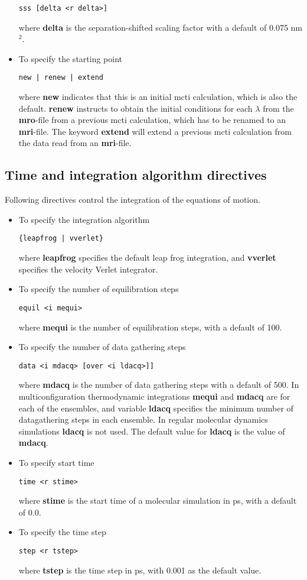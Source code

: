 \begin{itemize}
\begin{verbatim}
sss [delta <r delta>]
\end{verbatim}
where {\bf delta} is the separation-shifted scaling factor with a default
of 0.075 nm$^2$.
\item
To specify the starting point
\begin{verbatim}
new | renew | extend
\end{verbatim}
where {\bf new} indicates that this is an initial mcti calculation, which
is also the default. {\bf renew} instructs to obtain the initial
conditions for each $\lambda$ from the {\bf mro}-file from a previous 
mcti calculation, which has to be renamed to an {\bf mri}-file. The
keyword {\bf extend} will extend a previous mcti calculation from the
data read from an {\bf mri}-file.
\end{itemize}
\subsection{Time and integration algorithm directives}
Following directives control the integration of the equations of motion.
\begin{itemize}
\item
To specify the integration algorithm
\begin{verbatim}
{leapfrog | vverlet}
\end{verbatim}
where {\bf leapfrog} specifies the default leap frog integration, and
{\bf vverlet} specifies the velocity Verlet integrator.
\item
To specify the number of equilibration steps
\begin{verbatim}
equil <i mequi>
\end{verbatim}
where {\bf mequi} is the number of equilibration steps, with a default
of 100.
\item
To specify the number of data gathering steps
\begin{verbatim}
data <i mdacq> [over <i ldacq>]]
\end{verbatim}
where {\bf mdacq} is the number of data gathering steps with a
default of 500. In multiconfiguration thermodynamic integrations
{\bf mequi} and {\bf mdacq} are for each of the ensembles, and
variable {\bf ldacq} specifies the minimum number of datagathering steps 
in each ensemble. In regular molecular dynamics simulations {\bf ldacq}
is not used. The default value for {\bf ldacq} is the value of {\bf mdacq}.
\item
To specify start time
\begin{verbatim}
time <r stime>
\end{verbatim}
where {\bf stime} is the start time of a molecular simulation in ps,
with a default of 0.0.
\item
To specify the time step
\begin{verbatim}
step <r tstep>
\end{verbatim}
where {\bf tstep} is the time step in ps, with 0.001 as the default value.
\end{itemize}

